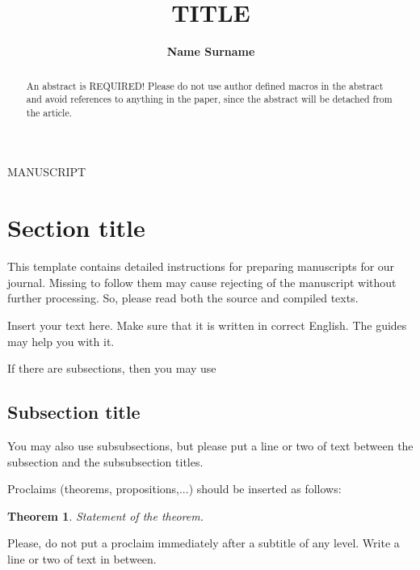 \documentclass[a4paper,draft]{amsproc}
\title[Running title / header]{TITLE}
\author[Surname]{\bfseries Name Surname} %
\theoremstyle{plain}
\newtheorem{thm}{Theorem}[section]
\theoremstyle{definition}
\theoremstyle{remark}
\numberwithin{equation}{section}
\begin{document}
{\begin{flushleft}\baselineskip9pt\scriptsize
MANUSCRIPT
\end{flushleft}}
\vspace{18mm} \setcounter{page}{1} \thispagestyle{empty}


\begin{abstract}
An abstract is REQUIRED!
Please do not use author defined macros in the abstract
and avoid references to anything in the paper,
since the abstract will be detached from the article.
\end{abstract}

\maketitle

\section{Section title}  %

This template contains detailed instructions for preparing manuscripts for our journal.
Missing to follow them may cause rejecting of the manuscript without further processing.
So, please read both the source and compiled texts.

Insert your text here. Make sure that it is written in correct English. 
The guides \cite{TrzD,TrzE} may help you with it.

If there are subsections, then you may use

\subsection{Subsection title}
You may also use subsubsections,
but please put a line or two of text between the subsection
and the subsubsection titles.

Proclaims (theorems, propositions,...) should be inserted as follows:

\begin{thm} \label{some label} %
Statement of the theorem.
\end{thm}

Please, do not put a proclaim immediately after a subtitle of any level.
Write a line or two of text in between.
\end{document}
